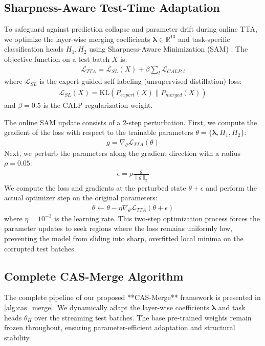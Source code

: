 \documentclass{article}
\begin{document}
\subsection{Sharpness-Aware Test-Time Adaptation}
To safeguard against prediction collapse and parameter drift during online TTA, we optimize the layer-wise merging coefficients $\boldsymbol{\lambda} \in \mathbb{R}^{13}$ and task-specific classification heads $H_1, H_2$ using Sharpness-Aware Minimization (SAM) \cite{foret2021sam}. The objective function on a test batch $X$ is:
\begin{align}
\mathcal{L}_{TTA} = \mathcal{L}_{SL}(X) + \beta \sum_{l} \mathcal{L}_{CALP, l}
\end{align}
where $\mathcal{L}_{SL}$ is the expert-guided self-labeling (unsupervised distillation) loss:
\begin{align}
\mathcal{L}_{SL}(X) = \text{KL}(P_{expert}(X) \| P_{merged}(X))
\end{align}
and $\beta = 0.5$ is the CALP regularization weight.

The online SAM update consists of a 2-step perturbation. First, we compute the gradient of the loss with respect to the trainable parameters $\theta = \{\boldsymbol{\lambda}, H_1, H_2\}$:
\begin{align}
g = \nabla_{\theta} \mathcal{L}_{TTA}(\theta)
\end{align}
Next, we perturb the parameters along the gradient direction with a radius $\rho = 0.05$:
\begin{align}
\epsilon = \rho \frac{g}{\| g \|_2}
\end{align}
We compute the loss and gradients at the perturbed state $\theta + \epsilon$ and perform the actual optimizer step on the original parameters:
\begin{align}
\theta \leftarrow \theta - \eta \nabla_{\theta} \mathcal{L}_{TTA}(\theta + \epsilon)
\end{align}
where $\eta = 10^{-3}$ is the learning rate. This two-step optimization process forces the parameter updates to seek regions where the loss remains uniformly low, preventing the model from sliding into sharp, overfitted local minima on the corrupted test batches.

\subsection{Complete CAS-Merge Algorithm}
The complete pipeline of our proposed **CAS-Merge** framework is presented in \cref{alg:cas_merge}. We dynamically adapt the layer-wise coefficients $\boldsymbol{\lambda}$ and task heads $\theta_H$ over the streaming test batches. The base pre-trained weights remain frozen throughout, ensuring parameter-efficient adaptation and structural stability.
\end{document}
